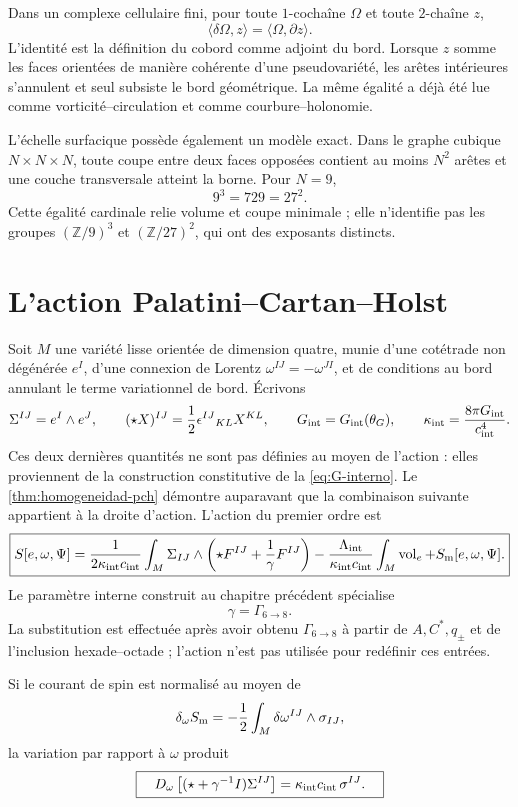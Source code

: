Dans un complexe cellulaire fini, pour toute \(1\)-cochaîne \(\Omega\) et toute
\(2\)-chaîne \(z\),
\[
 \boxed{\quad
 \langle\delta\Omega,z\rangle
 =\langle\Omega,\partial z\rangle.
 \quad}
\]
L'identité est la définition du cobord comme adjoint du bord.
Lorsque \(z\) somme les faces orientées de manière cohérente d'une
pseudovariété, les arêtes intérieures s'annulent et seul subsiste le
bord géométrique. La même égalité a déjà été lue comme
vorticité--circulation et comme courbure--holonomie.

L'échelle surfacique possède également un modèle exact. Dans le graphe cubique
\(N\times N\times N\), toute coupe entre deux faces opposées contient au moins
\(N^2\) arêtes et une couche transversale atteint la borne. Pour \(N=9\),
\[
 9^3=729=27^2.
\]
Cette égalité cardinale relie volume et coupe minimale ; elle n'identifie pas les
groupes \((\mathbb Z/9)^3\) et \((\mathbb Z/27)^2\), qui ont des exposants
distincts.

\section{L'action Palatini--Cartan--Holst}

Soit \(M\) une variété lisse orientée de dimension quatre, munie d'une cotétrade non
dégénérée \(e^I\), d'une connexion de Lorentz
\(\omega^{IJ}=-\omega^{JI}\), et de conditions au bord annulant le terme
variationnel de bord. Écrivons
\[
 \Sigma^{IJ}=e^I\wedge e^J,\qquad
 (\star X)^{IJ}=\frac12\epsilon^{IJ}{}_{KL}X^{KL},
 \qquad
 G_{\rm int}=G_{\rm int}(\theta_G),\qquad
 \kappa_{\rm int}=\frac{8\pi G_{\rm int}}{c_{\rm int}^{4}}.
\]
Ces deux dernières quantités ne sont pas définies au moyen de l'action : elles proviennent de
la construction constitutive de la \cref{eq:G-interno}. Le
\cref{thm:homogeneidad-pch} démontre auparavant que la combinaison suivante
appartient à la droite d'action.
L'action du premier ordre est
\[
\boxed{
 S[e,\omega,\Psi]
 =\frac1{2\kappa_{\rm int}c_{\rm int}}\int_M
 \Sigma_{IJ}\wedge
 \left(\star F^{IJ}+\frac1\gamma F^{IJ}\right)
 -\frac{\Lambda_{\rm int}}{\kappa_{\rm int}c_{\rm int}}
  \int_M\operatorname{vol}_e
 +S_{\rm m}[e,\omega,\Psi].}
\]
Le paramètre interne construit au chapitre précédent spécialise
\[
 \gamma=\Gamma_{6\to8}.
\]
La substitution est effectuée après avoir obtenu
\(\Gamma_{6\to8}\) à partir de \(A,C^\ast,q_\pm\) et de l'inclusion
hexade--octade ; l'action n'est pas utilisée pour redéfinir ces entrées.

\begin{theorem}
\label{thm:cartan-holst-rev6}
Si le courant de spin est normalisé au moyen de
\[
 \delta_\omega S_{\rm m}
 =-\frac12\int_M\delta\omega^{IJ}\wedge\sigma_{IJ},
\]
la variation par rapport à \(\omega\) produit
\[
 \boxed{\quad
 D_\omega
 \left[(\star+\gamma^{-1}I)\Sigma^{IJ}\right]
 =\kappa_{\rm int}c_{\rm int}\,\sigma^{IJ}.
 \quad}
\]
\end{theorem}

